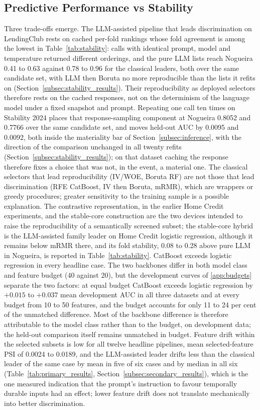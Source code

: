 \documentclass[final,5p,twocolumn]{elsarticle}
\begin{document}
\subsection{Predictive Performance vs Stability}
\label{subsec:performance_vs_stability}

Three trade-offs emerge. The LLM-assisted pipeline that leads discrimination on LendingClub rests on cached per-fold rankings whose fold agreement is among the lowest in Table~\ref{tab:stability}: calls with identical prompt, model and temperature returned different orderings, and the pure LLM lists reach Nogueira 0.41 to 0.63 against 0.78 to 0.96 for the classical leaders, both over the same candidate set, with LLM then Boruta no more reproducible than the lists it refits on (Section~\ref{subsec:stability_results}). Their reproducibility as deployed selectors therefore rests on the cached responses, not on the determinism of the language model under a fixed snapshot and prompt. Repeating one call ten times on Stability 2024 places that response-sampling component at Nogueira 0.8052 and 0.7766 over the same candidate set, and moves held-out AUC by 0.0095 and 0.0092, both inside the materiality bar of Section~\ref{subsec:inference}, with the direction of the comparison unchanged in all twenty refits (Section~\ref{subsec:stability_results}); on that dataset caching the response therefore fixes a choice that was not, in the event, a material one. The classical selectors that lead reproducibility (IV/WOE, Boruta RF) are not those that lead discrimination (RFE CatBoost, IV then Boruta, mRMR), which are wrappers or greedy procedures; greater sensitivity to the training sample is a possible explanation. The contrastive representation, in the earlier Home Credit experiments, and the stable-core construction are the two devices intended to raise the reproducibility of a semantically screened subset; the stable-core hybrid is the LLM-assisted family leader on Home Credit logistic regression, although it remains below mRMR there, and its fold stability, 0.08 to 0.28 above pure LLM in Nogueira, is reported in Table~\ref{tab:stability}. CatBoost exceeds logistic regression in every headline case. The two backbones differ in both model class and feature budget (40 against 20), but the development curves of \ref{app:budgets} separate the two factors: at equal budget CatBoost exceeds logistic regression by $+0.015$ to $+0.037$ mean development AUC in all three datasets and at every budget from 10 to 50 features, and the budget accounts for only 11 to 24 per cent of the unmatched difference. Most of the backbone difference is therefore attributable to the model class rather than to the budget, on development data; the held-out comparison itself remains unmatched in budget. Feature drift within the selected subsets is low for all twelve headline pipelines, mean selected-feature PSI of 0.0024 to 0.0189, and the LLM-assisted leader drifts less than the classical leader of the same case by mean in five of six cases and by median in all six (Table~\ref{tab:primary_results}, Section~\ref{subsec:secondary_results}), which is the one measured indication that the prompt's instruction to favour temporally durable inputs had an effect; lower feature drift does not translate mechanically into better discrimination.
\end{document}
